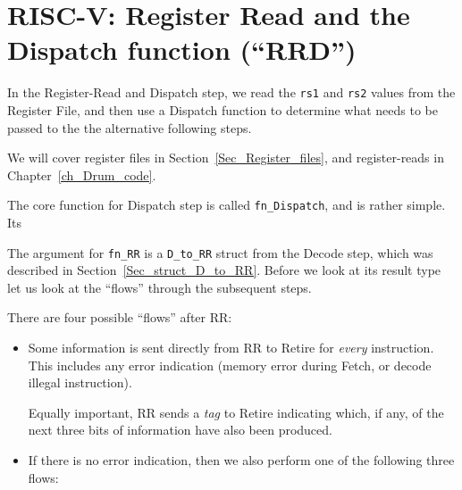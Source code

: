\section{RISC-V: Register Read and the Dispatch function (``RRD'')}

\label{Sec_RRD_function}



In the Register-Read and Dispatch step, we read the \verb|rs1| and
\verb|rs2| values from the Register File, and then use a Dispatch
function to determine what needs to be passed to the the alternative
following steps.

We will cover register files in Section~\ref{Sec_Register_files},
and register-reads in Chapter~\ref{ch_Drum_code}.

The core function for Dispatch step is called \verb|fn_Dispatch|, and
is rather simple.  Its

The argument for \verb|fn_RR| is a \verb|D_to_RR| struct from the
Decode step, which was described in Section~\ref{Sec_struct_D_to_RR}.
Before we look at its result type let us look at the ``flows'' through
the subsequent steps.

There are four possible ``flows'' after RR:

\begin{itemize}

  \item Some information is sent directly from RR to Retire for
    \emph{every} instruction.  This includes any error indication
    (memory error during Fetch, or decode illegal instruction).

    Equally important, RR sends a \emph{tag} to Retire indicating
    which, if any, of the next three bits of information have also
    been produced.

  \item If there is no error indication, then we also perform one of
  the following three flows:


\end{itemize}

